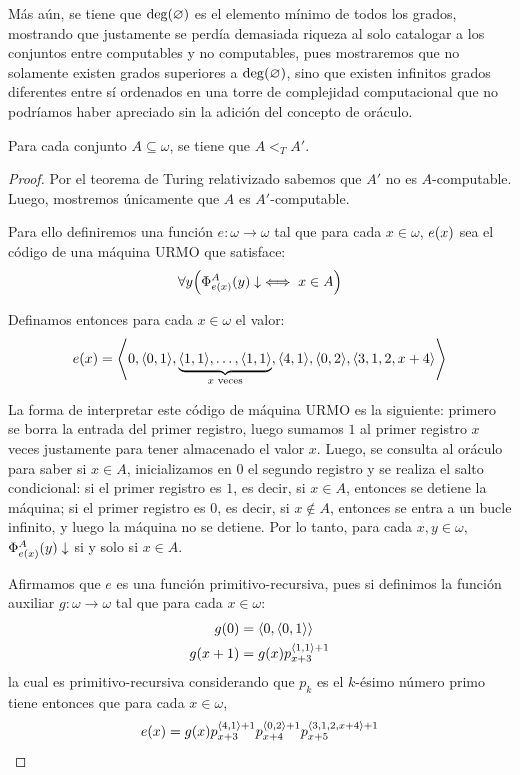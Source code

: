 \begin{agregado}
Más aún, se tiene que $\GRADO{\varnothing}$ es el elemento mínimo de todos los grados, mostrando que justamente se perdía demasiada riqueza al solo catalogar a los conjuntos entre computables y no computables, pues mostraremos que no solamente existen grados superiores a $\GRADO{\varnothing}$, sino que existen infinitos grados diferentes entre sí ordenados en una torre de complejidad computacional que no podríamos haber apreciado sin la adición del concepto de oráculo.
\end{agregado}

\begin{agregado}
\begin{theorem}
	\label{theo: salto_estricto}
	Para cada conjunto $A\subseteq\omega$, se tiene que $A <_{T} A'$.
\end{theorem}

\begin{proof}
	Por el teorema de Turing relativizado sabemos que $A'$ no es $A$-computable. Luego, mostremos únicamente que $A$ es $A'$-computable.

	Para ello definiremos una función $e:\omega\to\omega$ tal que para cada $x\in\omega$, $e\pa*{x}$ sea el código de una máquina URMO que satisface:
	\[
		\forall y\pa*{\Phi_{e\pa*{x}}^{A}\pa*{y}\ACABA\iff x\in A}
	\]

	Definamos entonces para cada $x\in\omega$ el valor:
	\[
		e\pa*{x} =\inner*{0,\inner*{0, 1},\underbrace{\inner*{1, 1},\dotsc,\inner*{1, 1}}_{x\text{ veces}},\inner*{4, 1},\inner*{0, 2},\inner*{3, 1, 2, x + 4}}
	\]

	La forma de interpretar este código de máquina URMO es la siguiente: primero se borra la entrada del primer registro, luego sumamos $1$ al primer registro $x$ veces justamente para tener almacenado el valor $x$. Luego, se consulta al oráculo para saber si $x\in A$, inicializamos en $0$ el segundo registro y se realiza el salto condicional: si el primer registro es $1$, es decir, si $x\in A$, entonces se detiene la máquina; si el primer registro es $0$, es decir, si $x\notin A$, entonces se entra a un bucle infinito, y luego la máquina no se detiene. Por lo tanto, para cada $x, y\in\omega$, $\Phi_{e\pa*{x}}^{A}\pa*{y}\ACABA$ si y solo si $x\in A$.

	Afirmamos que $e$ es una función primitivo-recursiva, pues si definimos la función auxiliar $g:\omega\to\omega$ tal que para cada $x\in\omega$:
	\begin{align*}
		g\pa*{0} &=\inner*{0,\inner*{0, 1}}\\
		g\pa*{x + 1} &= g\pa*{x}p_{x + 3}^{\inner*{1, 1} + 1}
	\end{align*}
	la cual es primitivo-recursiva considerando que $p_{k}$ es el $k$-ésimo número primo tiene entonces que para cada $x\in\omega$,
	\[
		e\pa*{x} = g\pa*{x}p_{x + 3}^{\inner*{4, 1} + 1}p_{x + 4}^{\inner*{0, 2} + 1}p_{x + 5}^{\inner*{3, 1, 2, x + 4} + 1}
	\]


\end{proof}
\end{agregado}
